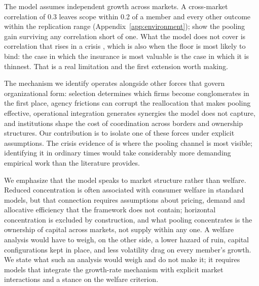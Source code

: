 The model assumes independent growth across markets. A cross-market correlation of 0.3 leaves scope within 0.2 of a member and every other outcome within the replication range (Appendix~\ref{app:environment}); \textcite{peters2022ergodicity} show the pooling gain surviving any correlation short of one. What the model does not cover is correlation that rises in a crisis \parencite{forbes2002no}, which is also when the floor is most likely to bind: the case in which the insurance is most valuable is the case in which it is thinnest. That is a real limitation and the first extension worth making.

The mechanism we identify operates alongside other forces that govern organizational form: selection determines which firms become conglomerates in the first place, agency frictions can corrupt the reallocation that makes pooling effective, operational integration generates synergies the model does not capture, and institutions shape the cost of coordination across borders and ownership structures. Our contribution is to isolate one of these forces under explicit assumptions. The crisis evidence of \textcite{kuppuswamy2016does} is where the pooling channel is most visible; identifying it in ordinary times would take considerably more demanding empirical work than the literature provides.

We emphasize that the model speaks to market structure rather than welfare. Reduced concentration is often associated with consumer welfare in standard models, but that connection requires assumptions about pricing, demand and allocative efficiency that the framework does not contain; horizontal concentration is excluded by construction, and what pooling concentrates is the ownership of capital across markets, not supply within any one. A welfare analysis would have to weigh, on the other side, a lower hazard of ruin, capital configurations kept in place, and less volatility drag on every member's growth. We state what such an analysis would weigh and do not make it; it requires models that integrate the growth-rate mechanism with explicit market interactions and a stance on the welfare criterion.
